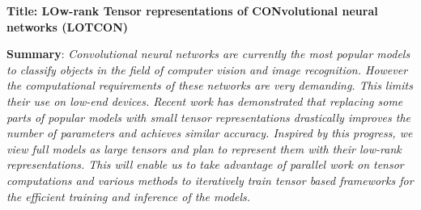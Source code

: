 
\usepackage{xspace}




%

\renewcommand{\prname}{LOTCON\xspace}
\renewcommand{\piname}{PI: Suraj KUMAR (LIP, ENS \& Inria Lyon)}

\noindent \textbf{Title: {LOw-rank Tensor representations of CONvolutional neural networks (LOTCON)}}



\bigskip

\noindent \textbf{Summary}: \emph{Convolutional neural networks are currently the most popular models to classify objects in the field of computer vision and image recognition. However the computational requirements of these networks are very demanding. This limits their use on low-end devices. Recent work has demonstrated that replacing some parts of popular models with small tensor representations drastically improves the number of parameters and achieves similar accuracy. Inspired by this progress, we view full models as large tensors and plan to represent them with their low-rank representations. This will enable us to take advantage of parallel work on tensor computations and various methods to iteratively train tensor based frameworks for the efficient training and inference of the models.}

